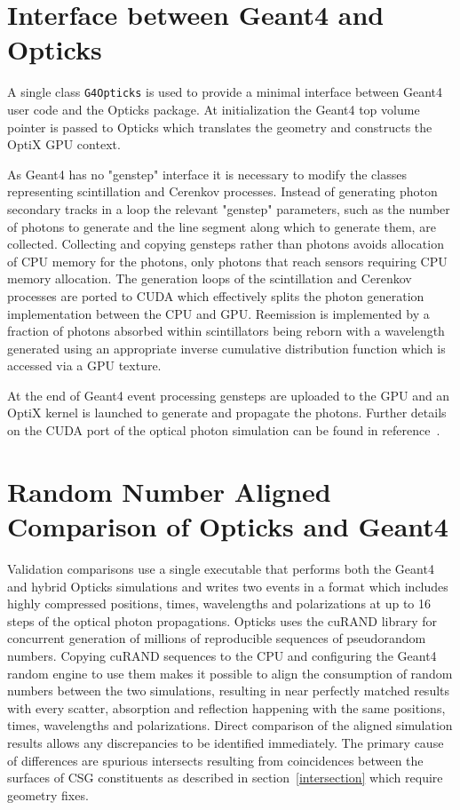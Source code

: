 \documentclass{webofc}
\begin{document}
\section{Interface between Geant4 and Opticks}
\label{simulation}
%
A single class {\tt G4Opticks} is used to provide a 
minimal interface between Geant4 user code and 
the Opticks package. 
At initialization the Geant4 top volume pointer is
passed to Opticks which translates the geometry and constructs 
the OptiX GPU context.

As Geant4 has no "genstep" interface it is necessary to modify the 
classes representing scintillation and Cerenkov processes.
Instead of generating photon secondary tracks in a loop the relevant "genstep" parameters, 
such as the number of photons to generate and the line segment along which to generate them, 
are collected. Collecting and copying gensteps rather than photons avoids allocation of CPU memory
for the photons, only photons that reach sensors requiring CPU memory allocation.
The generation loops of the scintillation and Cerenkov processes are ported to CUDA 
which effectively splits the photon generation implementation between the CPU and GPU.
Reemission is implemented by a fraction of photons absorbed within scintillators being 
reborn with a wavelength generated using an appropriate inverse cumulative distribution function
which is accessed via a GPU texture.

At the end of Geant4 event processing gensteps are uploaded to the GPU and an OptiX 
kernel is launched to generate and propagate the photons.
Further details on the CUDA port of the optical photon simulation can be found in reference~\cite{chep2016}.

%
\section{Random Number Aligned Comparison of Opticks and Geant4}
\label{validation}
%
Validation comparisons use a single executable that performs both
the Geant4 and hybrid Opticks simulations and writes two events in a format
which includes highly compressed positions, times, wavelengths and polarizations at up to 16 steps of the optical photon propagations.
Opticks uses the cuRAND\cite{curandURL} library for concurrent generation of millions of reproducible sequences of pseudorandom numbers.  
Copying cuRAND sequences to the CPU and configuring the Geant4 random engine to use them makes it possible to align the 
consumption of random numbers between the two simulations, resulting in near perfectly matched results with every scatter, 
absorption and reflection happening with the same positions, times, wavelengths and polarizations.
Direct comparison of the aligned simulation results allows any discrepancies to be identified immediately.
The primary cause of differences are spurious intersects resulting from coincidences between the surfaces
of CSG constituents as described in section~\ref{intersection} which require geometry fixes.
%
\end{document}
